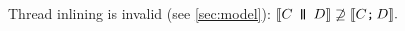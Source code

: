 Thread inlining is invalid (see \textsection\ref{sec:model}):
\begin{math}
  \sem{\aCmd \PAR \bCmd}
  \not\supseteq
  \sem{\aCmd \SEMI \bCmd}.
\end{math}







